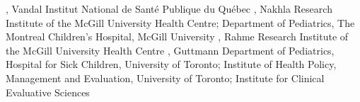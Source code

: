 {
,  {Vandal}
{Institut National de Santé Publique du Québec}
,  {Nakhla}
{Research Institute of the McGill University Health Centre; Department of Pediatrics, The Montreal Children’s Hospital, McGill University}
,  {Rahme}
{Research Institute of the McGill University Health Centre}
,  {Guttmann}
{Department of Pediatrics, Hospital for Sick Children, University of Toronto; Institute of Health Policy, Management and Evaluation, University of Toronto; Institute for Clinical Evaluative Sciences}
}
